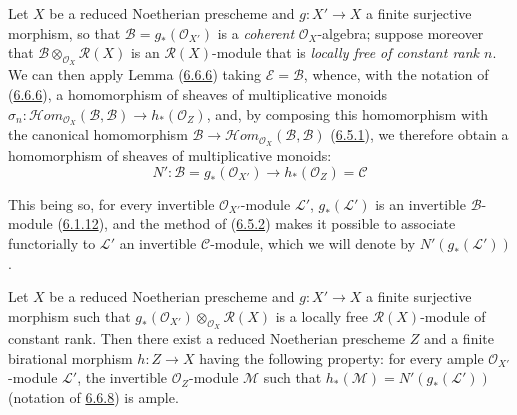 \begin{env}[6.6.8]
\label{II.6.6.8}
Let $X$ be a reduced Noetherian prescheme and $g:X'\to X$ a finite
surjective morphism, so that $\mathcal{B}=g_*(\mathcal{O}_{X'})$ is a
\emph{coherent} $\mathcal{O}_X$-algebra; suppose moreover that
$\mathcal{B}\otimes_{\mathcal{O}_X}\mathcal{R}(X)$ is an
$\mathcal{R}(X)$-module that is \emph{locally free of constant rank $n$}. We
can then apply Lemma (\hyperref[II.6.6.6]{6.6.6}) taking
$\mathcal{E}=\mathcal{B}$, whence, with the notation of
(\hyperref[II.6.6.6]{6.6.6}), a homomorphism of sheaves of multiplicative
monoids
$\sigma_n:\mathcal{H}om_{\mathcal{O}_X}(\mathcal{B},\mathcal{B})
\to h_*(\mathcal{O}_Z)$, and, by composing this homomorphism with
the canonical homomorphism
$\mathcal{B}\to
\mathcal{H}om_{\mathcal{O}_X}(\mathcal{B},\mathcal{B})$
(\hyperref[II.6.5.1]{6.5.1}), we therefore obtain a homomorphism of
sheaves of multiplicative monoids:
\[
\label{II.6.6.8.1}
N':\mathcal{B}=g_*(\mathcal{O}_{X'})\longrightarrow
h_*(\mathcal{O}_Z)=\mathcal{C}
\tag{6.6.8.1}
\]

This being so, for every invertible $\mathcal{O}_{X'}$-module $\mathcal{L}'$,
$g_*(\mathcal{L}')$ is an invertible $\mathcal{B}$-module
(\hyperref[II.6.1.12]{6.1.12}), and the method of
(\hyperref[II.6.5.2]{6.5.2}) makes it possible to associate functorially to
$\mathcal{L}'$ an invertible $\mathcal{C}$-module, which we will denote by
$N'(g_*(\mathcal{L}'))$.
\end{env}

\begin{lemma}[6.6.9]
\label{II.6.6.9}
Let $X$ be a reduced Noetherian prescheme and $g:X'\to X$ a finite
surjective morphism such that
$g_*(\mathcal{O}_{X'})\otimes_{\mathcal{O}_X}\mathcal{R}(X)$ is a
locally free $\mathcal{R}(X)$-module of constant rank. Then there exist
a reduced Noetherian prescheme $Z$ and a finite birational morphism
$h:Z\to X$ having the following property: for every ample
$\mathcal{O}_{X'}$-module $\mathcal{L}'$, the invertible
$\mathcal{O}_Z$-module $\mathcal{M}$ such that
$h_*(\mathcal{M})=N'(g_*(\mathcal{L}'))$ \textup{(notation of
\hyperref[II.6.6.8]{6.6.8})} is ample.
\end{lemma}

